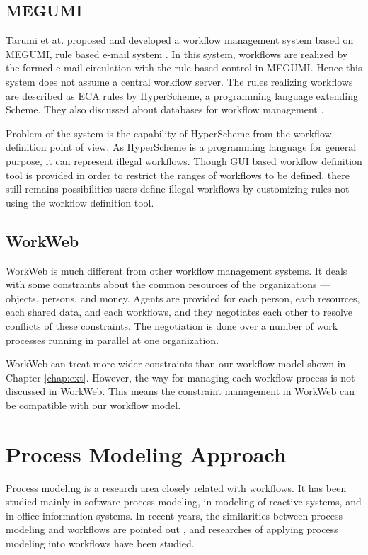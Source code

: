 \subsection{MEGUMI}

Tarumi et at. proposed and developed a workflow management system based
on MEGUMI, rule based e-mail system \cite{tarumi:tipsj95,%
yoshifu:tripsj95-1}.  In this system, workflows are realized by the
formed e-mail circulation with the rule-based control in MEGUMI\@.  Hence
this system does not assume a central workflow server.  The rules
realizing workflows are described as ECA rules by HyperScheme, a
programming language extending Scheme.  They also discussed about
databases for workflow management \cite{yoshifu:tripsj95-1}.

Problem of the system is the capability of HyperScheme from the workflow
definition point of view.  As HyperScheme is a programming language for
general purpose, it can represent illegal workflows.  Though GUI based
workflow definition tool is provided in order to restrict the ranges of
workflows to be defined, there still remains possibilities users define
illegal workflows by customizing rules not using the workflow definition
tool.

\subsection{WorkWeb}

WorkWeb \cite{tarumi:tripsj95-6, tarumi:tripsj96-1} is much
different from other workflow management systems.  It deals with some
constraints about the common resources of the organizations --- objects,
persons, and money.  Agents are provided for each person, each resources,
each shared data, and each workflows, and they negotiates each other to
resolve conflicts of these constraints.  The negotiation is done over
a number of work processes running in parallel at one organization.

WorkWeb can treat more wider constraints than our workflow model shown
in Chapter \ref{chap:ext}.  However, the way for managing each workflow
process is not discussed in WorkWeb.  This means the constraint
management in WorkWeb can be compatible with our workflow model.

\section{Process Modeling Approach}

Process modeling is a research area closely related with workflows.  It
has been studied mainly in software process modeling, in modeling of
reactive systems, and in office information systems.  In recent years,
the similarities between process modeling and workflows are pointed out
\cite{robinson:nsf96}, and researches of applying process modeling into
workflows have been studied.

